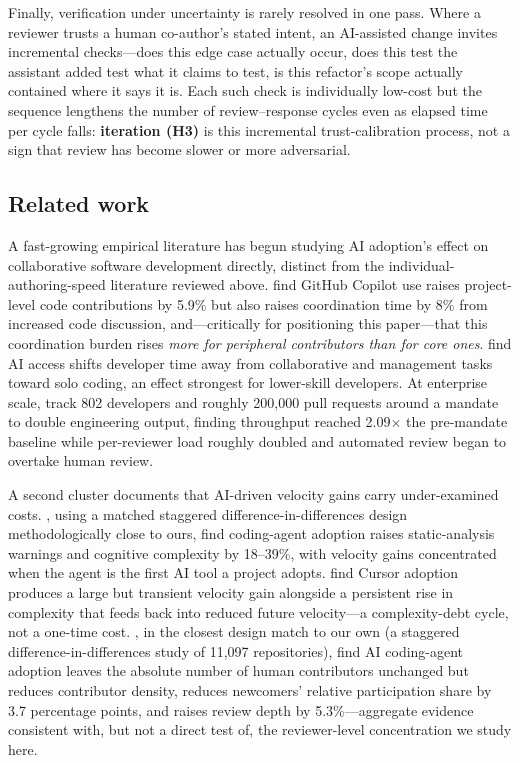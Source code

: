 \documentclass[12pt]{article}
\begin{document}
Finally, verification under uncertainty is rarely resolved in one pass.
Where a reviewer trusts a human co-author's stated intent, an AI-assisted
change invites incremental checks---does this edge case actually occur,
does this test the assistant added test what it claims to test, is this
refactor's scope actually contained where it says it is. Each such check
is individually low-cost but the sequence lengthens the number of
review--response cycles even as elapsed time per cycle falls:
\textbf{iteration (H3)} is this incremental trust-calibration process,
not a sign that review has become slower or more adversarial.

\subsection{Related work}

A fast-growing empirical literature has begun studying AI adoption's
effect on collaborative software development directly, distinct from the
individual-authoring-speed literature reviewed above. \citet{song2026impact}
find GitHub Copilot use raises project-level code contributions by 5.9\%
but also raises coordination time by 8\% from increased code discussion,
and---critically for positioning this paper---that this coordination
burden rises \emph{more for peripheral contributors than for core ones}.
\citet{hoffmann2025generative} find AI access shifts developer time away
from collaborative and management tasks toward solo coding, an effect
strongest for lower-skill developers. At enterprise scale,
\citet{he2026aiwrites} track 802 developers and roughly 200,000 pull
requests around a mandate to double engineering output, finding
throughput reached 2.09$\times$ the pre-mandate baseline while
per-reviewer load roughly doubled and automated review began to overtake
human review.

A second cluster documents that AI-driven velocity gains carry
under-examined costs. \citet{agarwal2026aiides}, using a matched
staggered difference-in-differences design methodologically close to
ours, find coding-agent adoption raises static-analysis warnings and
cognitive complexity by 18--39\%, with velocity gains concentrated when
the agent is the first AI tool a project adopts. \citet{he2026cursor}
find Cursor adoption produces a large but transient velocity gain
alongside a persistent rise in complexity that feeds back into reduced
future velocity---a complexity-debt cycle, not a one-time cost.
\citet{zhang2026augmentation}, in the closest design match to our own
(a staggered difference-in-differences study of 11,097 repositories),
find AI coding-agent adoption leaves the absolute number of human
contributors unchanged but reduces contributor density, reduces
newcomers' relative participation share by 3.7 percentage points, and
raises review depth by 5.3\%---aggregate evidence consistent with, but
not a direct test of, the reviewer-level concentration we study here.
\end{document}
